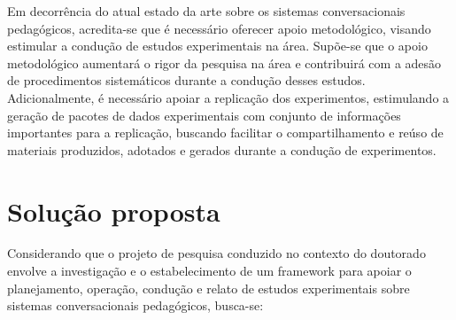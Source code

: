 Em decorrência do atual estado da arte sobre os sistemas conversacionais pedagógicos, acredita-se que é necessário oferecer apoio metodológico, visando estimular a condução de estudos experimentais na área. Supõe-se que o apoio metodológico aumentará o rigor da pesquisa na área e contribuirá com a adesão de procedimentos sistemáticos durante a condução desses estudos. Adicionalmente, é necessário apoiar a replicação dos experimentos, estimulando a geração de pacotes de dados experimentais com conjunto de informações importantes para a replicação, buscando facilitar o compartilhamento e reúso de materiais produzidos, adotados e gerados durante a condução de experimentos.

\section{Solução proposta}

Considerando que o projeto de pesquisa conduzido no contexto do doutorado envolve a investigação e o estabelecimento de um framework para apoiar o planejamento, operação, condução e relato de estudos experimentais sobre sistemas conversacionais pedagógicos, busca-se:

